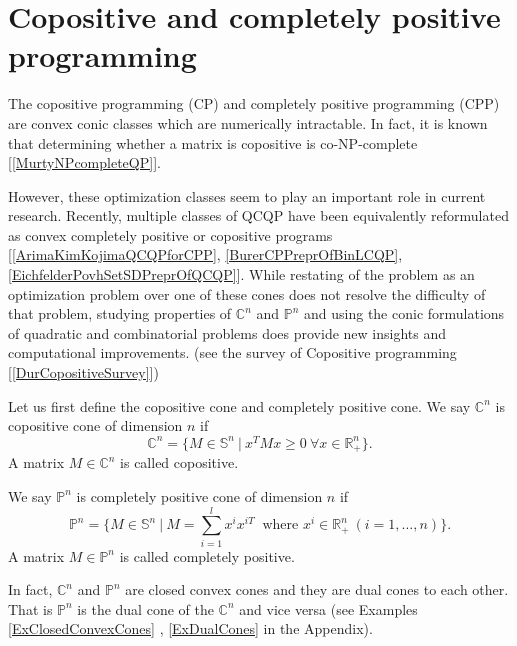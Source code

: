\documentclass[12pt]{book}
\theoremstyle{definition}
\begin{document}
\section{Copositive and completely positive programming}


The copositive programming (CP) and completely positive programming (CPP) are convex conic classes which are %
numerically intractable. 
In fact, it is known that determining whether a matrix is copositive is co-NP-complete 	[\ref{MurtyNPcompleteQP}]. 

However, these optimization classes seem to play an important role in current research. Recently, multiple classes of QCQP have been equivalently reformulated as convex completely positive or copositive programs [\ref{ArimaKimKojimaQCQPforCPP}, \ref{BurerCPPreprOfBinLCQP}, \ref{EichfelderPovhSetSDPreprOfQCQP}]. While restating of the problem as an optimization problem over one of these cones does not resolve
the difficulty of that problem, studying properties of $\mathbb{C}^n$ and $\mathbb{P}^n$ and
using the conic formulations of quadratic and combinatorial problems does
provide new insights and computational improvements. (see the survey of Copositive programming [\ref{DurCopositiveSurvey}])


Let us first define the copositive cone and completely positive cone.
\label{defCopositiveCone} We say $\mathbb{C}^n$ is copositive cone of dimension $n$ if 
\begin{equation*}
\mathbb{C}^n=\{M\in \mathbb{S}^n \ | \ x^TMx\geq 0 \ \forall x\in \mathbb{R}^n_+ \}.
\end{equation*}
A matrix $M \in \mathbb{C}^n$ is called copositive.


\label{defCPPcone} We say $\mathbb{P}^n$ is completely positive cone of dimension $n$ if 
\begin{equation*}
\mathbb{P}^n=\{M\in \mathbb{S}^n \ | \ M = \sum_{i = 1}^l x^{i}x^{iT} \ \mbox{ where } x^i \in \mathbb{R}^n_+ \ (i = 1,\dots ,n) \}.
\end{equation*}
A matrix $M\in \mathbb{P}^n$ is called completely positive.

In fact, $\mathbb{C}^n$ and $\mathbb{P}^n$ are closed convex cones and they are dual cones to each other.
That is $\mathbb{P}^n$ is the dual cone of the $\mathbb{C}^n$ and vice versa (see Examples \ref{ExClosedConvexCones} , \ref{ExDualCones} in the Appendix).
\end{document}
